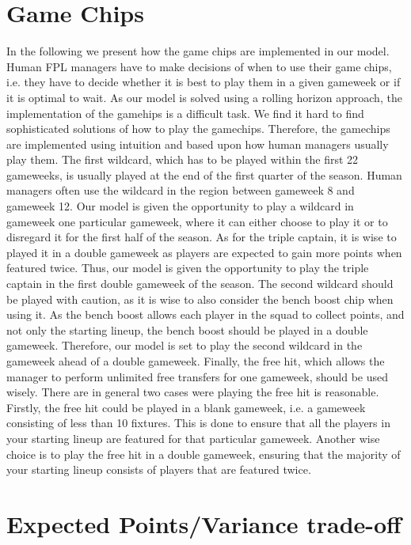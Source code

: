 \newpage
\section{Game Chips}\label{Ch.5_Game_chips}
In the following we present how the game chips are implemented in our model. Human FPL managers have to make decisions of when to use their game chips, i.e. they have to decide whether it is best to play them in a given gameweek or if it is optimal to wait. As our model is solved using a rolling horizon approach, the implementation of the gamehips is a difficult task. We find it hard to find sophisticated solutions of how to play the gamechips. Therefore, the gamechips are implemented using intuition and based upon how human managers usually play them. 
\newpar
The first wildcard, which has to be played within the first 22 gameweeks, is usually played at the end of the first quarter of the season. Human managers often use the wildcard in the region between gameweek 8 and gameweek 12. Our model is given the opportunity to play a wildcard in gameweek one particular gameweek, where it can either choose to play it or to disregard it for the first half of the season. 
\newpar
As for the triple captain, it is wise to played it in a double gameweek as players are expected to gain more points when featured twice. Thus, our model is given the opportunity to play the triple captain in the first double gameweek of the season. 
\newpar
The second wildcard should be played with caution, as it is wise to also consider the bench boost chip when using it. As the bench boost allows each player in the squad to collect points, and not only the starting lineup, the bench boost should be played in a double gameweek. Therefore, our model is set to play the second wildcard in the gameweek ahead of a double gameweek.
\newpar
Finally, the free hit, which allows the manager to perform unlimited free transfers for one gameweek, should be used wisely. There are in general two cases were playing the free hit is reasonable. Firstly, the free hit could be played in a blank gameweek, i.e. a gameweek consisting of less than 10 fixtures. This is done to ensure that all the players in your starting lineup are featured for that particular gameweek. Another wise choice is to play the free hit in a double gameweek, ensuring that the majority of your starting lineup consists of players that are featured twice. 





\newpage
\section{Expected Points/Variance trade-off}

